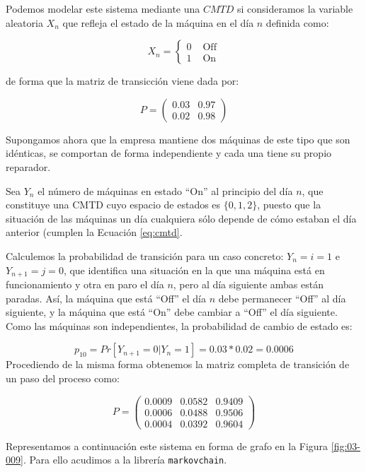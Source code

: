 \documentclass[
]{book}
\theoremstyle{definition}
\theoremstyle{definition}
\theoremstyle{definition}
\theoremstyle{definition}
\theoremstyle{remark}
\begin{document}
Podemos modelar este sistema mediante una \(CMTD\) si consideramos la variable aleatoria \(X_n\) que refleja el estado de la máquina en el día \(n\) definida como:

\begin{equation*}
X_{n} = 
\begin{cases}
0 & \text{ Off}\\
1 & \text{ On}
\end{cases}
\end{equation*}

de forma que la matriz de transicción viene dada por:

\[P = 
\begin{pmatrix}
0.03 & 0.97\\
0.02 & 0.98
\end{pmatrix}\]

Supongamos ahora que la empresa mantiene dos máquinas de este tipo que son idénticas, se comportan de forma independiente y cada una tiene su propio reparador.

Sea \(Y_n\) el número de máquinas en estado ``On'' al principio del día \(n\), que constituye una CMTD cuyo espacio de estados es \(\{0, 1, 2\}\), puesto que la situación de las máquinas un día cualquiera sólo depende de cómo estaban el día anterior (cumplen la Ecuación \eqref{eq:cmtd}.

Calculemos la probabilidad de transición para un caso concreto: \(Y_n = i = 1\) e \(Y_{n+1} = j = 0\), que identifica una situación en la que una máquina está en funcionamiento y otra en paro el día \(n\), pero al día siguiente ambas están paradas. Así, la máquina que está ``Off'' el día \(n\) debe permanecer ``Off'' al día siguiente, y la máquina que está ``On'' debe cambiar a ``Off'' el día siguiente. Como las máquinas son independientes, la probabilidad de cambio de estado es:

\[p_{10}=Pr[Y_{n+1} = 0 | Y_n = 1] = 0.03 * 0.02 = 0.0006\] Procediendo de la misma forma obtenemos la matriz completa de transición de un paso del proceso como:

\[P = 
\begin{pmatrix}
0.0009 & 0.0582 & 0.9409\\
0.0006 & 0.0488 & 0.9506\\
0.0004 & 0.0392 & 0.9604
\end{pmatrix}\]

Representamos a continuación este sistema en forma de grafo en la Figura \ref{fig:03-009}. Para ello acudimos a la librería \texttt{markovchain}.
\end{document}
